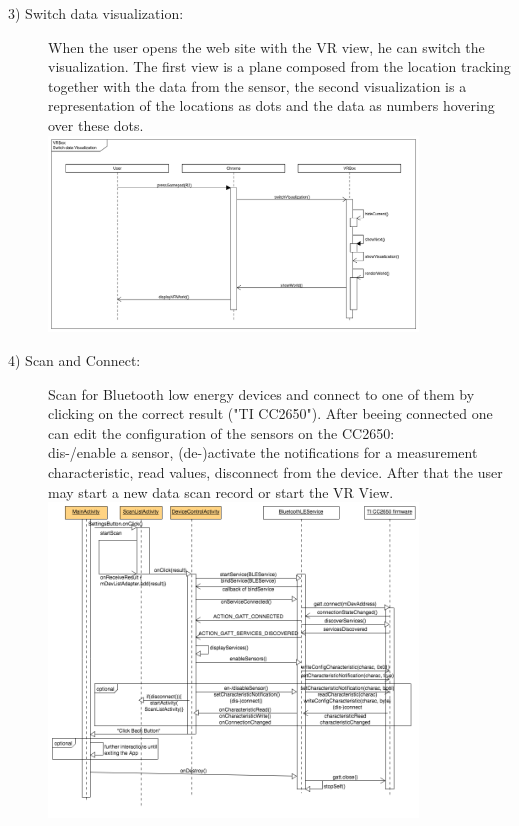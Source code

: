 \begin{description}
	\item[3) Switch data visualization: ] When the user opens the web site with the VR view, he  can switch the visualization. The first view is a plane composed from
  the location tracking together with the data from the sensor, the second visualization is a representation of the locations as dots
  and the data as numbers hovering over these dots.  \\
	\includegraphics[width=0.8\textwidth]{diagramms/switchVisual.png}

	\item[4) Scan and Connect:] Scan for Bluetooth low energy devices and connect to one of them by clicking on the correct result ("TI CC2650").
	After beeing connected one can edit the configuration of the sensors on the CC2650: \\dis-/enable a sensor, (de-)activate the notifications for a measurement characteristic, read values, disconnect from the device. After that the user may start a new data scan record or start the VR View.\\
	\includegraphics[width=0.8\textwidth]{diagramms/bleseq.png}


\end{description}
